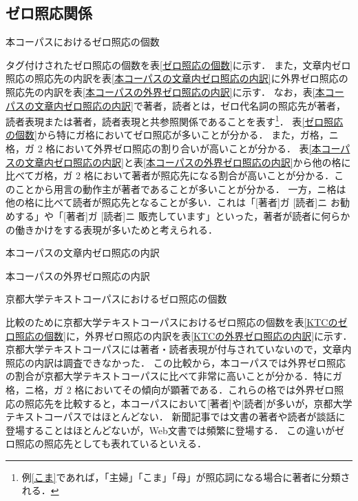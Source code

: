 \documentclass[japanese]{jnlp_1.4}
\begin{document}
\subsection{ゼロ照応関係}

\begin{table}[b]
\caption{本コーパスにおけるゼロ照応の個数}
\label{ゼロ照応の個数}

\end{table}

タグ付けされたゼロ照応の個数を表\ref{ゼロ照応の個数}に示す．
また，文章内ゼロ照応の照応先の内訳を表\ref{本コーパスの文章内ゼロ照応の内訳}に外界ゼロ照応の照応先の内訳を表\ref{本コーパスの外界ゼロ照応の内訳}に示す．
なお，表\ref{本コーパスの文章内ゼロ照応の内訳}で著者，読者とは，ゼロ代名詞の照応先が著者，読者表現または著者，読者表現と共参照関係であることを表す\footnote{例\ref{こま}であれば，「主婦」「こま」「母」が照応詞になる場合に著者に分類される．}．
表\ref{ゼロ照応の個数}から特にガ格においてゼロ照応が多いことが分かる．
また，ガ格，ニ格，ガ 2 格において外界ゼロ照応の割り合いが高いことが分かる．
表\ref{本コーパスの文章内ゼロ照応の内訳}と表\ref{本コーパスの外界ゼロ照応の内訳}から他の格に比べてガ格，ガ 2 格において著者が照応先になる割合が高いことが分かる．このことから用言の動作主が著者であることが多いことが分かる．
一方，ニ格は他の格に比べて読者が照応先となることが多い．これは「[著者]ガ [読者]ニ お勧めする」や「[著者]ガ [読者]ニ 販売しています」といった，著者が読者に何らかの働きかけをする表現が多いためと考えられる．

\begin{table}[b]
\caption{本コーパスの文章内ゼロ照応の内訳}
\label{本コーパスの文章内ゼロ照応の内訳}

\end{table}
\begin{table}[b]
\caption{本コーパスの外界ゼロ照応の内訳}
\label{本コーパスの外界ゼロ照応の内訳}

\end{table}
\begin{table}[b]
\caption{京都大学テキストコーパスにおけるゼロ照応の個数}
\label{KTCのゼロ照応の個数}

\end{table}

比較のために京都大学テキストコーパスにおけるゼロ照応の個数を表\ref{KTCのゼロ照応の個数}に，外界ゼロ照応の内訳を表\ref{KTCの外界ゼロ照応の内訳}に示す．京都大学テキストコーパスには著者・読者表現が付与されていないので，文章内照応の内訳は調査できなかった．
この比較から，本コーパスでは外界ゼロ照応の割合が京都大学テキストコーパスに比べて非常に高いことが分かる．特にガ格，ニ格，ガ 2 格においてその傾向が顕著である．これらの格では外界ゼロ照応の照応先を比較すると，本コーパスにおいて[著者]や[読者]が多いが，京都大学テキストコーパスではほとんどない．
新聞記事では文書の著者や読者が談話に登場することはほとんどないが，Web文書では頻繁に登場する．
この違いがゼロ照応の照応先としても表れているといえる．
\end{document}
